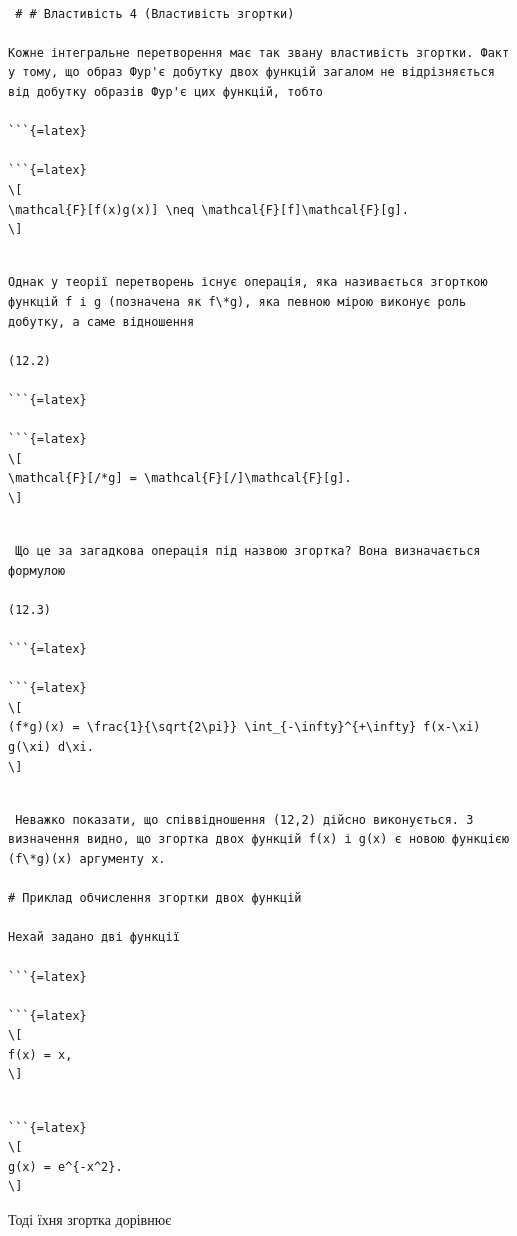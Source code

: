 \documentclass[
  ukrainian,
]{article}
\begin{document}
\begin{verbatim}

 # # Властивість 4 (Властивість згортки)

Кожне інтегральне перетворення має так звану властивість згортки. Факт у тому, що образ Фур'є добутку двох функцій загалом не відрізняється від добутку образів Фур'є цих функцій, тобто

```{=latex}

```{=latex}
\[
\mathcal{F}[f(x)g(x)] \neq \mathcal{F}[f]\mathcal{F}[g].
\]
\end{verbatim}

\begin{verbatim}

Однак у теорії перетворень існує операція, яка називається згорткою функцій f і g (позначена як f\*g), яка певною мірою виконує роль добутку, а саме відношення

(12.2)

```{=latex}

```{=latex}
\[
\mathcal{F}[/*g] = \mathcal{F}[/]\mathcal{F}[g].
\]
\end{verbatim}

\begin{verbatim}

 Що це за загадкова операція під назвою згортка? Вона визначається формулою

(12.3)

```{=latex}

```{=latex}
\[
(f*g)(x) = \frac{1}{\sqrt{2\pi}} \int_{-\infty}^{+\infty} f(x-\xi) g(\xi) d\xi.
\]
\end{verbatim}

\begin{verbatim}

 Неважко показати, що співвідношення (12,2) дійсно виконується. З визначення видно, що згортка двох функцій f(x) і g(x) є новою функцією (f\*g)(x) аргументу x.

# Приклад обчислення згортки двох функцій

Нехай задано дві функції

```{=latex}

```{=latex}
\[
f(x) = x,
\]
\end{verbatim}

\begin{verbatim}

```{=latex}
\[
g(x) = e^{-x^2}.
\]
\end{verbatim}

Тоді їхня згортка дорівнює
\end{document}
